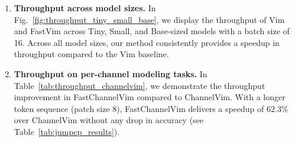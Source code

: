 \begin{enumerate}
    \item \textbf{Throughput across model sizes.} In Fig.~\ref{fig:throughput_tiny_small_base}, we display the throughput of Vim and FastVim across Tiny, Small, and Base-sized models with a batch size of 16. Across all model sizes, our method consistently provides a speedup in throughput compared to the Vim baseline.
\\

    \item \textbf{Throughput on per-channel modeling tasks.} In Table~\ref{tab:throughput_channelvim}, we demonstrate the throughput improvement in FastChannelVim compared to ChannelVim. With a longer token sequence (patch size 8), FastChannelVim delivers a speedup of $62.3\%$ over ChannelVim without any drop in accuracy (see Table~\ref{tab:jumpcp_results}).
\\

\begin{table}[!h]
    \caption{Comparison of inference throughput analysis between ChannelVim and FastChannelVim across patch sizes 16 and 8. Autocast is set to false, and LayerNorm is added post-SSM. Each cell image has a resolution of 224 $\times$ 224 $\times$ 8, and the batch size is set to 8.}
    \begin{center}
\end{center}
    \label{tab:throughput_channelvim}
\end{table}



\end{enumerate}

